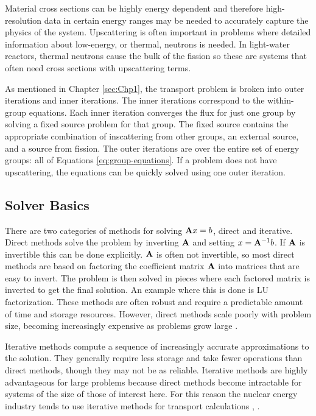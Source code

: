 Material cross sections can be highly energy dependent and therefore high-resolution data in certain energy ranges may be needed to accurately capture the physics of the system. Upscattering is often important in problems where detailed information about low-energy, or thermal, neutrons is needed. In light-water reactors, thermal neutrons cause the bulk of the fission so these are systems that often need cross sections with upscattering terms.  

As mentioned in Chapter \ref{sec:Chp1}, the transport problem is broken into outer iterations and inner iterations. The inner iterations correspond to the within-group equations. Each inner iteration converges the flux for just one group by solving a fixed source problem for that group. The fixed source contains the appropriate combination of inscattering from other groups, an external source, and a source from fission.  The outer iterations are over the entire set of energy groups: all of Equations \eqref{eq:group-equations}. If a problem does not have upscattering, the equations can be quickly solved using one outer iteration. 

\subsection{Solver Basics}
There are two categories of methods for solving $\mathbf{A}x = b$, direct and iterative. Direct methods solve the problem by inverting $\mathbf{A}$ and setting $x = \mathbf{A}^{-1}b$. If $\mathbf{A}$ is invertible this can be done explicitly. $\mathbf{A}$ is often not invertible, so most direct methods are based on factoring the coefficient matrix $\mathbf{A}$ into matrices that are easy to invert. The problem is then solved in pieces where each factored matrix is inverted to get the final solution. An example where this is done is LU factorization. These methods are often robust and require a predictable amount of time and storage resources. However, direct methods scale poorly with problem size, becoming increasingly expensive as problems grow large \cite{Benzi2002}.

Iterative methods compute a sequence of increasingly accurate approximations to the solution. They generally require less storage and take fewer operations than direct methods, though they may not be as reliable. Iterative methods are highly advantageous for large problems because direct methods become intractable for systems of the size of those of interest here. For this reason the nuclear energy industry tends to use iterative methods for transport calculations \cite{Birkhoff1984}, \cite{Benzi2002}. 

